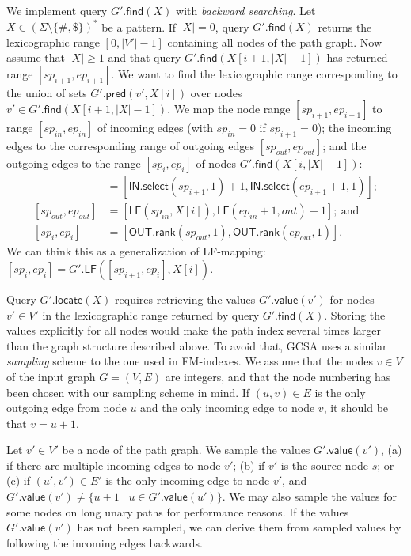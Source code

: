 \documentclass[a4paper,UKenglish]{lipics-v2016}
\newcommand{\set}[1]{\ensuremath{\{ #1 \}}}
\newcommand{\abs}[1]{\ensuremath{\lvert #1 \rvert}}
\newcommand{\rank}{\ensuremath{\mathsf{rank}}}
\newcommand{\select}{\ensuremath{\mathsf{select}}}
\newcommand{\LF}{\ensuremath{\mathsf{LF}}}
\newcommand{\find}{\ensuremath{\mathsf{find}}}
\newcommand{\locate}{\ensuremath{\mathsf{locate}}}
\newcommand{\gpred}{\ensuremath{\mathsf{pred}}}
\newcommand{\gvalue}{\ensuremath{\mathsf{value}}}
\newcommand{\LFmapping}{LF\nobreakdash-mapping}
\newcommand{\patternset}{\ensuremath{(\Sigma \setminus \set{\#, \$})^{\ast}}}
\newcommand{\bvIN}{\ensuremath{\mathsf{IN}}}
\newcommand{\bvOUT}{\ensuremath{\mathsf{OUT}}}
\begin{document}
We implement query $G'.\find(X)$ with \emph{backward searching}. Let $X \in \patternset$ be a pattern. If $\abs{X} = 0$, query $G'.\find(X)$ returns the lexicographic range $[0, \abs{V'}-1]$ containing all nodes of the path graph. Now assume that $\abs{X} \ge 1$ and that query $G'.\find(X[i+1, \abs{X}-1])$ has returned range $[sp_{i+1}, ep_{i+1}]$. We want to find the lexicographic range corresponding to the union of sets $G'.\gpred(v', X[i])$ over nodes $v' \in G'.\find(X[i+1, \abs{X}-1])$. We map the node range $[sp_{i+1}, ep_{i+1}]$ to range $[sp_{in}, ep_{in}]$ of incoming edges (with $sp_{in} = 0$ if $sp_{i+1} = 0$); the incoming edges to the corresponding range of outgoing edges $[sp_{out}, ep_{out}]$; and the outgoing edges to the range $[sp_{i}, ep_{i}]$ of nodes $G'.\find(X[i, \abs{X}-1])$:
\begin{align*}
[sp_{in}, ep_{in}] & = [\bvIN.\select(sp_{i+1}, 1) + 1, \bvIN.\select(ep_{i+1}+1, 1)]; \\
[sp_{out}, ep_{out}] & = [\LF(sp_{in}, X[i]), \LF(ep_{in}+1, out) - 1];\ \textrm{and} \\
[sp_{i}, ep_{i}] & = [\bvOUT.\rank(sp_{out}, 1), \bvOUT.\rank(ep_{out}, 1)].
\end{align*}
We can think this as a generalization of \LFmapping: $[sp_{i}, ep_{i}] = G'.\LF([sp_{i+1}, ep_{i}], X[i])$.

Query $G'.\locate(X)$ requires retrieving the values $G'.\gvalue(v')$ for nodes $v' \in V'$ in the lexicographic range returned by query $G'.\find(X)$. Storing the values explicitly for all nodes would make the path index several times larger than the graph structure described above. To avoid that, GCSA uses a similar \emph{sampling} scheme to the one used in FM-indexes. We assume that the nodes $v \in V$ of the input graph $G = (V, E)$ are integers, and that the node numbering has been chosen with our sampling scheme in mind. If $(u, v) \in E$ is the only outgoing edge from node $u$ and the only incoming edge to node $v$, it should be that $v = u+1$.

Let $v' \in V'$ be a node of the path graph. We sample the values $G'.\gvalue(v')$, (a) if there are multiple incoming edges to node $v'$; (b) if $v'$ is the source node $s$; or (c) if $(u', v') \in E'$ is the only incoming edge to node $v'$, and $G'.\gvalue(v') \ne \set{u+1 \mid u \in G'.\gvalue(u')}$. We may also sample the values for some nodes on long unary paths for performance reasons. If the values $G'.\gvalue(v')$ has not been sampled, we can derive them from sampled values by following the incoming edges backwards.
\end{document}
